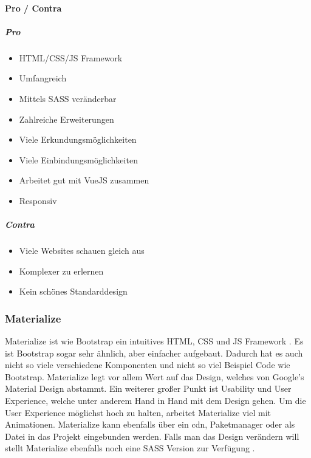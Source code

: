 		\paragraph{Pro / Contra}
		\subparagraph{Pro}
		\begin{itemize}
			\item HTML/CSS/JS Framework
			\item Umfangreich
			\item Mittels SASS veränderbar
			\item Zahlreiche Erweiterungen
			\item Viele Erkundungsmöglichkeiten
			\item Viele Einbindungsmöglichkeiten
			\item Arbeitet gut mit VueJS zusammen
			\item Responsiv
		\end{itemize}
		\subparagraph{Contra}
		\begin{itemize}
			\item Viele Websites schauen gleich aus
			\item Komplexer zu erlernen
			\item Kein schönes Standarddesign
		\end{itemize}
	
		\subsubsection{Materialize}
		Materialize ist wie Bootstrap ein intuitives HTML, CSS und JS Framework \cite{materialize-intro}. Es ist Bootstrap sogar sehr ähnlich, aber einfacher aufgebaut. Dadurch hat es auch nicht so viele verschiedene Komponenten und nicht so viel Beispiel Code wie Bootstrap. Materialize legt vor allem Wert auf das Design, welches von Google's Material Design abstammt. Ein weiterer großer Punkt ist Usability und User Experience, welche unter anderem Hand in Hand mit dem Design gehen. Um die User Experience möglichst hoch zu halten, arbeitet Materialize viel mit Animationen. Materialize kann ebenfalls über ein \Gls{cdn}, Paketmanager oder als Datei in das Projekt eingebunden werden. Falls man das Design verändern will stellt Materialize ebenfalls noch eine SASS Version zur Verfügung \cite{WebDocMaterialize}.
